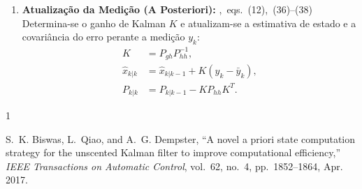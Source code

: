 \documentclass{article}
\newcommand{\stepref}[1]{\hfill\mbox{\footnotesize\normalfont\textsf{\cite{biswas2017}, #1}}}
\begin{document}
\begin{algorithmbox}
\begin{enumerate}[leftmargin=*, itemsep=6pt]
    \item \textbf{Atualiza\c{c}\~ao da Medi\c{c}\~ao (A Posteriori):} \stepref{eqs.~(12), (36)--(38)} \\
    Determina-se o ganho de Kalman $K$ e atualizam-se a estimativa de estado e a covari\^ancia do erro perante a medi\c{c}\~ao $y_k$:
    \begin{align}
        K &= P_{gh} P_{hh}^{-1}, \\
        \hat{x}_{k|k} &= \hat{x}_{k|k-1} + K \left(y_k - \bar{y}_k\right), \\
        P_{k|k} &= P_{k|k-1} - K P_{hh} K^T.
    \end{align}
\end{enumerate}
\end{algorithmbox}

\begin{thebibliography}{1}

S.~K. Biswas, L.~Qiao, and A.~G. Dempster, ``A novel a priori state computation strategy for the unscented Kalman filter to improve computational efficiency,'' \emph{IEEE Transactions on Automatic Control}, vol.~62, no.~4, pp.~1852--1864, Apr. 2017.

\end{thebibliography}
\end{document}
